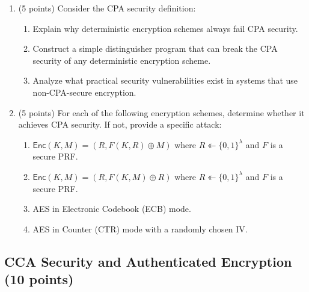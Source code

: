 \documentclass[10pt,a4paper,american]{article}
\begin{document}
\begin{enumerate}
	\item (5 points) Consider the CPA security definition:
	      \begin{center}
	      \end{center}
	      \begin{enumerate}
		      \item Explain why deterministic encryption schemes always fail CPA security.
		      \item Construct a simple distinguisher program that can break the CPA security of any deterministic encryption scheme.
		      \item Analyze what practical security vulnerabilities exist in systems that use non-CPA-secure encryption.
	      \end{enumerate}

	\item (5 points) For each of the following encryption schemes, determine whether it achieves CPA security. If not, provide a specific attack:
	      \begin{enumerate}
		      \item $\textsf{Enc}(K, M) = (R, F(K, R) \oplus M)$ where $R \twoheadleftarrow \{0,1\}^{\lambda}$ and $F$ is a secure PRF.
		      \item $\textsf{Enc}(K, M) = (R, F(K, M) \oplus R)$ where $R \twoheadleftarrow \{0,1\}^{\lambda}$ and $F$ is a secure PRF.
		      \item AES in Electronic Codebook (ECB) mode.
		      \item AES in Counter (CTR) mode with a randomly chosen IV.
	      \end{enumerate}
\end{enumerate}

\subsection{CCA Security and Authenticated Encryption (10 points)}
\end{document}
